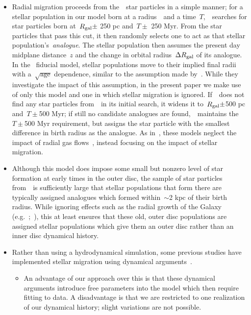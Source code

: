 \documentclass[ms.tex]{subfiles}
\begin{document}
\begin{itemize}
	\item Radial migration proceeds from the~\hsim~star particles in a simple 
	manner; for a stellar population in our model born at a radius~\rgal~and a 
	time~$T$,~\vice~searches for star particles born at~$R_\text{gal} \pm$ 250 pc 
	and~$T \pm$ 250 Myr. 
	From the star particles that pass this cut, it then randomly selects one 
	to act as that stellar population's~\textit{analogue}. 
	The stellar population then assumes the present day midplane distance~$z$ 
	and the change in orbital radius~$\Delta R_\text{gal}$ of its analogue. 
	In the~\citet{Johnson2021} fiducial model, stellar populations move to 
	their implied final radii with a~$\sqrt{\text{age}}$ dependence, similar 
	to the assumption made by~\citet{Frankel2018, Frankel2019}. 
	While they investigate the impact of this assumption, in the present paper 
	we make use of only this model and one in which stellar migration is 
	ignored. 
	If~\vice~does not find any star particles from~\hsim~in its initial search, 
	it widens it to~$R_\text{gal} \pm$500 pc and~$T \pm$500 Myr; if still no 
	candidate analogues are found,~\vice~maintains the~$T \pm$500 Myr 
	requirement, but assigns the star particle with the smallest difference in 
	birth radius as the analogue. 
	As in~\citet{Johnson2021}, these models neglect the impact of radial 
	gas flows~\citep[e.g.][]{Lacey1985, Bilitewski2012, Vincenzo2020}, instead 
	focusing on the impact of stellar migration. 

	\item Although this model does impose some small but nonzero level of star 
	formation at early times in the outer disc, the sample of star particles 
	from~\hsim~is sufficiently large that stellar populations that form there 
	are typically assigned analogues which formed within~$\sim$2 kpc of their 
	birth radius. 
	While ignoring effects such as the radial growth of the Galaxy 
	(e.g.~\citealp*{Bird2012};~\citealp{Bird2013}), this at least ensures that 
	these old, outer disc populations are assigned stellar populations which 
	give them an outer disc rather than an inner disc dynamical history. 

	\item Rather than using a hydrodynamical simulation, some previous studies 
	have implemented stellar migration using dynamical 
	arguments~\citep[e.g.][]{Schoenrich2009, Sharma2020}. 
	\begin{itemize} 
		\item An advantage of our approach over this is that these dynamical 
		arguments introduce free parameters into the model which then require 
		fitting to data. 
		A disadvantage is that we are restricted to one realization of our 
		dynamical history; slight variations are not possible. 


\end{itemize}
\end{itemize}
\end{document}
